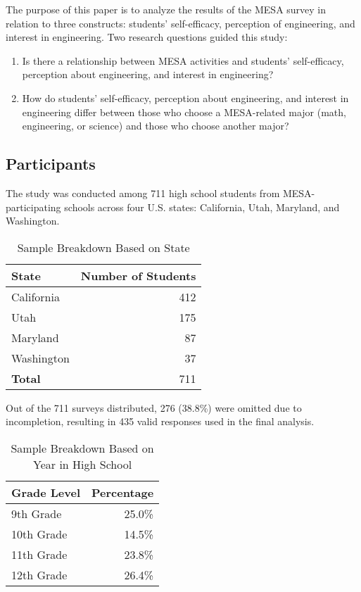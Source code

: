 \documentclass[11pt]{article}
\begin{document}
The purpose of this paper is to analyze the results of the MESA survey in relation to three constructs: students’ self-efficacy, perception of engineering, and interest in engineering. Two research questions guided this study:

\begin{enumerate}
    \item Is there a relationship between MESA activities and students’ self-efficacy, perception about engineering, and interest in engineering?
    \item How do students’ self-efficacy, perception about engineering, and interest in engineering differ between those who choose a MESA-related major (math, engineering, or science) and those who choose another major?
\end{enumerate}

\subsection{Participants}

The study was conducted among 711 high school students from MESA-participating schools across four U.S. states: California, Utah, Maryland, and Washington. 

\begin{table}[h]
\centering
\begin{tabular}{lr}
\hline
\textbf{State} & \textbf{Number of Students} \\
\hline
California & 412 \\
Utah       & 175 \\
Maryland   & 87 \\
Washington & 37 \\
\hline
\textbf{Total} & 711 \\
\hline
\end{tabular}
\caption{Sample Breakdown Based on State}
\label{tab:state-breakdown}
\end{table}

Out of the 711 surveys distributed, 276 (38.8\%) were omitted due to incompletion, resulting in 435 valid responses used in the final analysis. 

\begin{table}[h]
\centering
\begin{tabular}{lr}
\hline
\textbf{Grade Level} & \textbf{Percentage} \\
\hline
9th Grade  & 25.0\% \\
10th Grade & 14.5\% \\
11th Grade & 23.8\% \\
12th Grade & 26.4\% \\
\hline
\end{tabular}
\caption{Sample Breakdown Based on Year in High School}
\label{tab:grade-breakdown}
\end{table}
\end{document}
